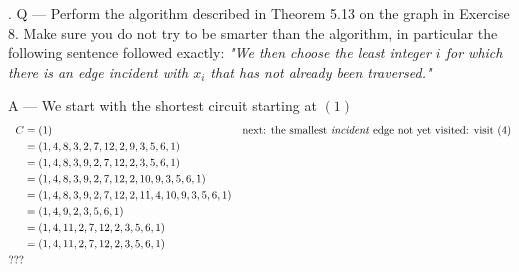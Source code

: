 \documentclass{article}
\newcounter{question}
\begin{document}
\newcommand\Que[1]{%
   \leavevmode\par
   \stepcounter{question}
   \noindent
   \thequestion. Q --- #1\par}

\newcommand\Ans[2][]{%
    \leavevmode\par\noindent
   {\leftskip37pt
    A --- \textbf{#1}#2\par}}

\Que{
  Perform the algorithm described in Theorem 5.13 on the graph in 
  Exercise 8. Make sure you do not try to be smarter than the algorithm, 
  in particular the following sentence followed exactly: 
  \textit{"We then choose the least integer $i$ for which there is an edge 
  incident with $x_i$ that has not already been traversed."}
    }
\Ans{
  We start with the shortest circuit starting at $(1)$\\
  \begin{align*}
    C &=(1) && \text{next: the smallest \textit{incident} edge not yet visited: visit $(4)$}\\
    &=(1,4,8,3,2,7,12,2,9,3,5,6,1) \\
    &=(1,4,8,3,9,2,7,12,2,3,5,6,1) \\
    &=(1,4,8,3,9,2,7,12,2,10,9,3,5,6,1) \\
    &=(1,4,8,3,9,2,7,12,2,11,4,10,9,3,5,6,1) \\
    &=(1,4,9,2,3,5,6,1) && \\
    &=(1,4,11,2,7,12,2,3,5,6,1) && \\
    &=(1,4,11,2,7,12,2,3,5,6,1) && \\
    ???
  \end{align*}
  }
\end{document}
